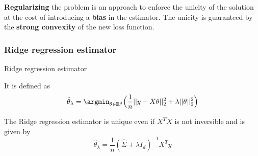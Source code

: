\documentclass[
10pt, %
a4paper, %
oneside, %
headinclude,footinclude, %
BCOR5mm, %
]{scrartcl}
\begin{document}
\textbf{{Regularizing}} the problem is an approach to enforce the unicity of the solution at the cost of introducing a \textbf{{bias}} in the estimator. The unicity is guaranteed by the \textbf{{strong convexity}} of the new loss function.

\subsubsection{\large\color{Periwinkle}Ridge regression estimator}

\begin{definition}{Ridge regression estimator}

    It is defined as
\begin{equation}
    \label{risk:ridge}
    \hat{ \theta}_{\lambda} = \argmin_{\theta \in \mathbb{R}^d} \Big( \frac{1}{n} ||y-X\theta||_2^2 + \lambda || \theta||_2^2 \Big)
\end{equation}
\end{definition}


\begin{proposition}

    The Ridge regression estimator is unique even if $X^TX$ is not inversible and is given by
    \begin{equation*}
	\hat{ \theta}_{\lambda} = \frac{1}{n} ( \hat{\Sigma} +\lambda I_d)^{-1}X^Ty
    \end{equation*}
\end{proposition}
\end{document}

